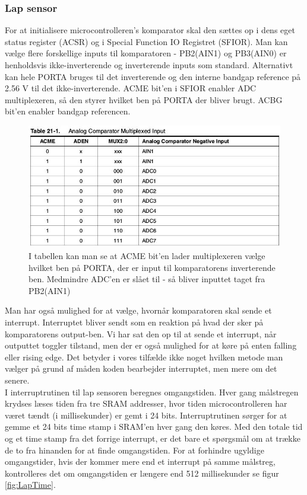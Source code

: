 \subsubsection{Lap sensor}

For at initialisere microcontrolleren's komparator skal den sættes op i dens eget status register (ACSR) og i Special Function IO Registret (SFIOR). Man kan vælge flere forskellige inputs til komparatoren - PB2(AIN1) og PB3(AIN0) er henholdsvis ikke-inverterende og inverterende inputs som standard. Alternativt kan hele PORTA bruges til det inverterende og den interne bandgap reference på 2.56 V til det ikke-inverterende.  ACME bit'en i SFIOR enabler ADC multiplexeren, så den styrer hvilket ben på PORTA der bliver brugt. ACBG bit'en enabler bandgap referencen.

\begin{figure}[h]

	\centering
		\includegraphics[scale=0.3]{Billeder/Table21-1.jpg}
	\caption{I tabellen kan man se at ACME bit'en lader multiplexeren vælge hvilket ben på PORTA, der er input til komparatorens inverterende ben. Medmindre ADC'en er slået til - så bliver inputtet taget fra PB2(AIN1)}
	\label{fig:ACME}
	
\end{figure}

Man har også mulighed for at vælge, hvornår komparatoren skal sende et interrupt. Interruptet bliver sendt som en reaktion på hvad der sker på komparatorens output-ben. Vi har sat den op til at sende et interrupt, når outputtet toggler tilstand, men der er også mulighed for at køre på enten falling eller rising edge. Det betyder i vores tilfælde ikke noget hvilken metode man vælger på grund af måden koden bearbejder interruptet, men mere om det senere.\\

I interruptrutinen til lap sensoren beregnes omgangstiden. Hver gang målstregen krydses læses tiden fra tre SRAM addresser, hvor tiden microcontrolleren har været tændt (i millisekunder) er gemt i 24 bits. Interruptrutinen sørger for at gemme et 24 bits time stamp i SRAM'en hver gang den køres. Med den totale tid og et time stamp fra det forrige interrupt, er det bare et spørgsmål om at trække de to fra hinanden for at finde omgangstiden. For at forhindre ugyldige omgangstider, hvis der kommer mere end et interrupt på samme målstreg, kontrolleres det om omgangstiden er længere end 512 millisekunder se figur \ref{fig:LapTime}.

